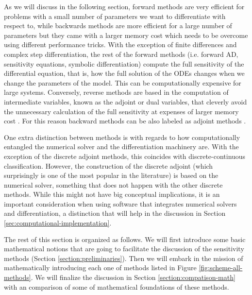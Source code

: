 As we will discuss in the following section, forward methods are very efficient for problems with a small number of parameters we want to differentiate with respect to, while backwards methods are more efficient for a large number of parameters  but they came with a larger memory cost which needs to be overcome using different performance tricks. 
With the exception of finite differences and complex step differentiation, the rest of the forward methods (i.e. forward AD, sensitivity equations, symbolic differentiation) compute the full sensitivity of the differential equation, that is, how the full solution of the ODEs changes when we change the parameters of the model. 
This can be computationally expensive for large systems. 
Conversely, reverse methods are based in the computation of intermediate variables, known as the adjoint or dual variables, that cleverly avoid the unnecessary calculation of the full sensitivity at expenses of larger memory cost \cite{Givoli_2021}. 
For this reason backward methods can be also labeled as adjoint methods \cite{ma2021comparison}. 

One extra distinction between methods is with regards to how computationally entangled the numerical solver and the differentiation machinery are. 
With the exception of the discrete adjoint methods, this coincides with discrete-continuous classification. 
However, the construction of the discrete adjoint (which surprisingly is one of the most popular in the literature) is based on the numerical solver, something that does not happen with the other discrete methods. 
While this might not have big conceptual implications, it is an important consideration when using software that integrates numerical solvers and differentiation, a distinction that will help in the discussion in Section \ref{sec:computational-implementation}.


The rest of this section is organized as follows. 
We will first introduce some basic mathematical notions that are going to facilitate the discussion of the sensitivity methods (Section \ref{section:preliminaries}).
Then we will embark in the mission of mathematically introducing each one of methods listed in Figure \ref{fig:scheme-all-methods}.
We will finalize the discussion in Section \ref{section:compatison-math} with an comparison of some of mathematical foundations of these methods. 
